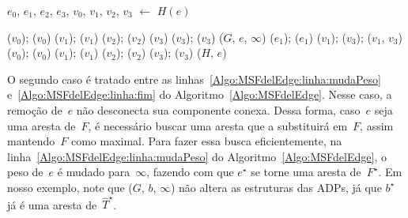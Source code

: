 \begin{algorithm}[hbt]
\caption{\MSFdelEdge($G$, $e$)}
\label{Algo:MSFdelEdge}
\begin{algorithmic}[1]
\State $e_0$, $e_1$, $e_2$, $e_3$, $v_0$, $v_1$, $v_2$, $v_3$ $\gets$ $H(e)$
\label{Algo:MSFdelEdge:linha2}

\State \LCOCycle($v_0$); \LCOSplit($v_0$)\label{Algo:MSFdelEdge:linha3}
\State \LCOCycle($v_1$); \LCOSplit($v_1$)\label{Algo:MSFdelEdge:c1:v1}
\State \LCOCycle($v_2$); \LCOSplit($v_2$)\label{Algo:MSFdelEdge:c1:v2}
\State \LCOSplit($v_3$) \label{Algo:MSFdelEdge:c1:split}
\State \LCOCycle($v_3$); \LCOSplit($v_3$)\label{Algo:MSFdelEdge:linha12}
\Else{}
\State \MSFupdate($G$, $e$, $\infty$)\label{Algo:MSFdelEdge:linha:mudaPeso}
\State \LCOCycle($e_1$); \LCOSplit($e_1$) \label{Algo:MSFdelEdge:linha:split}
\State \LCOCycle($v_1$); \LCOCycle($v_3$); \LCOMerge($v_1$, $v_3$) \label{Algo:MSFdelEdge:linha:merge}
\State \LCOCycle($v_0$); \LCOSplit($v_0$) \label{Algo:MSFdelEdge:linha:1cs}
\State \LCOCycle($v_1$); \LCOSplit($v_1$)
\State \LCOCycle($v_2$); \LCOSplit($v_2$)
\State \LCOCycle($v_3$); \LCOSplit($v_3$)
	\label{Algo:MSFdelEdge:linha:ucs}
	\label{Algo:MSFdelEdge:linha:fim}
\EndIf
\State \LCODestroyOcto($H$, $e$)\label{Algo:MSFdelEdge:linha:desaloca}
\end{algorithmic}
\end{algorithm}

O segundo caso é tratado entre as linhas~\ref{Algo:MSFdelEdge:linha:mudaPeso} e~\ref{Algo:MSFdelEdge:linha:fim} do Algoritmo~\ref{Algo:MSFdelEdge}.
Nesse caso, a remoção de~$e$ não desconecta sua componente conexa.
Dessa forma, caso~$e$ seja uma aresta de~$F$, é necessário buscar uma aresta que a substituirá em~$F$, assim mantendo~$F$ como maximal.
Para fazer essa busca eficientemente, na linha~\ref{Algo:MSFdelEdge:linha:mudaPeso} do Algoritmo~\ref{Algo:MSFdelEdge}, o peso de~$e$ é mudado para~$\infty$, fazendo com que $e^\star$ se torne uma aresta de~$F^\star$. 
Em nosso exemplo, note que \MSFupdate($G$, $b$, $\infty$) não altera as estruturas das ADPs, já que $b^\star$ já é uma aresta de~$\hat T^\star$.

